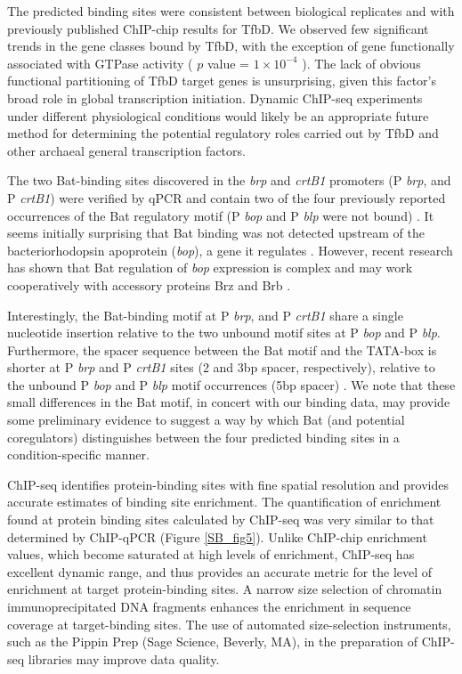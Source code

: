 The predicted binding sites were consistent between biological replicates and with previously published ChIP-chip results for TfbD. We observed few significant trends in the gene classes bound by TfbD, with the exception of gene functionally associated with GTPase activity ( $p$ value = $1\times 10^{-4}$ ). The lack of obvious functional partitioning of TfbD target genes is unsurprising, given this factor's broad role in global transcription initiation. Dynamic ChIP-seq experiments under different physiological conditions would likely be an appropriate future method for determining the potential regulatory roles carried out by TfbD and other archaeal general transcription factors.

The two Bat-binding sites discovered in the {\em brp} and {\em crtB1} promoters (P {\em brp}, and P {\em crtB1}) were verified by qPCR and contain two of the four previously reported occurrences of the Bat regulatory motif (P {\em bop} and P {\em blp} were not bound) \cite{baliga_genomic_2001}. It seems initially surprising that Bat binding was not detected upstream of the bacteriorhodopsin apoprotein ({\em bop}), a gene it regulates \cite{baliga_genomic_2001,gropp1994bat,leong1988characterization,baliga_coordinate_2002}. However, recent research has shown that Bat regulation of {\em bop} expression is complex and may work cooperatively with accessory proteins Brz and Brb \cite{tarasov2008small,tarasov2011small}.

Interestingly, the Bat-binding motif at P {\em brp}, and P {\em crtB1} share a single nucleotide insertion relative to the two unbound motif sites at P {\em bop} and P {\em blp}. Furthermore, the spacer sequence between the Bat motif and the TATA-box is shorter at P {\em brp} and P {\em crtB1} sites (2 and 3bp spacer, respectively), relative to the unbound P {\em bop} and P {\em blp} motif occurrences (5bp spacer) \cite{baliga_genomic_2001}. We note that these small differences in the Bat motif, in concert with our binding data, may provide some preliminary evidence to suggest a way by which Bat (and potential coregulators) distinguishes between the four predicted binding sites in a condition-specific manner.

ChIP-seq identifies protein-binding sites with fine spatial resolution and provides accurate estimates of binding site enrichment. The quantification of enrichment found at protein binding sites calculated by ChIP-seq was very similar to that determined by ChIP-qPCR (Figure \ref{SB_fig5}). Unlike ChIP-chip enrichment values, which become saturated at high levels of enrichment, ChIP-seq has excellent dynamic range, and thus provides an accurate metric for the level of enrichment at target protein-binding sites. A narrow size selection of chromatin immunoprecipitated DNA fragments enhances the enrichment in sequence coverage at target-binding sites. The use of automated size-selection instruments, such as the Pippin Prep (Sage Science, Beverly, MA), in the preparation of ChIP-seq libraries may improve data quality.


